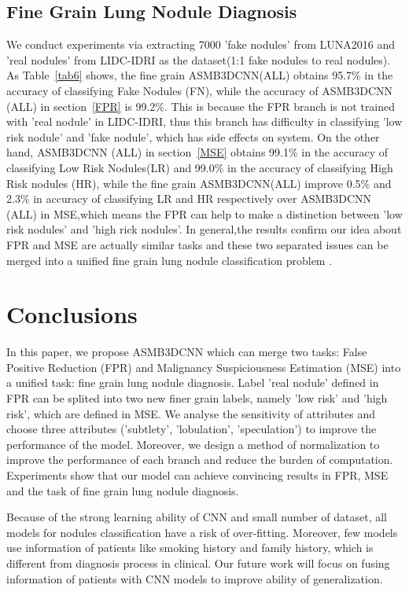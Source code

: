 \documentclass{article}
\begin{document}
\vspace{-0.3cm}
\subsection{Fine Grain Lung Nodule Diagnosis}
\label{sec:format}
\vspace{-0.1cm}
We conduct experiments via extracting 7000 'fake nodules' from LUNA2016 and 'real nodules' from LIDC-IDRI as the dataset(1:1 fake nodules to real nodules).
As Table~\ref{tab6} shows, the fine grain ASMB3DCNN(ALL) obtains 95.7\% in the accuracy of classifying Fake Nodules (FN), while the accuracy of ASMB3DCNN (ALL) in section~\ref{FPR} is 99.2\%. This is because the FPR branch is not trained with 'real nodule' in LIDC-IDRI, thus this branch has difficulty in classifying 'low risk nodule' and 'fake nodule', which has side effects on system.
On the other hand, ASMB3DCNN (ALL) in section~\ref{MSE} obtains 99.1\% in the accuracy of classifying Low Risk Nodules(LR) and 99.0\% in the accuracy of classifying High Risk nodules (HR), while the fine grain ASMB3DCNN(ALL) improve 0.5\% and 2.3\% in accuracy of classifying LR and HR respectively over ASMB3DCNN (ALL) in MSE,which means the FPR can help to make a distinction between 'low risk nodules' and 'high rick nodules'.
In general,the results confirm our idea about FPR and MSE are actually similar tasks and these two separated issues can be merged into a unified fine grain lung nodule classification problem .



\section{Conclusions}
\label{conclude}
In this paper, we propose ASMB3DCNN which can merge two tasks: False Positive Reduction (FPR) and Malignancy Suspiciousness Estimation (MSE) into a unified task: fine grain lung nodule diagnosis. Label 'real nodule' defined in FPR can be splited into two new finer grain labels, namely 'low risk' and 'high risk', which are defined in MSE.
We analyse the sensitivity of attributes and choose three attributes ('subtlety', 'lobulation', 'speculation') to improve the performance of the model.
Moreover, we design a method of normalization to improve the performance of each branch and reduce the burden of computation.
Experiments show that our model can achieve convincing results in FPR, MSE and the task of fine grain lung nodule diagnosis.

Because of the strong learning ability of CNN and small number of dataset, all models for nodules classification have a risk of over-fitting. Moreover, few models use information of patients like smoking history and family history, which is different from diagnosis process in clinical. Our future work will focus on fusing information of patients with CNN models to improve ability of generalization.
\end{document}
